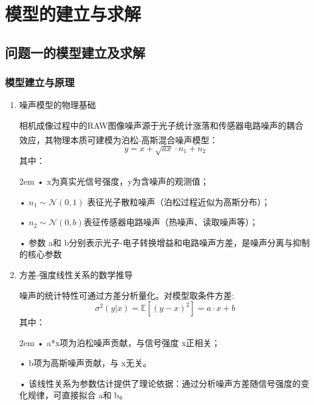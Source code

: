 \documentclass[a4paper]{article}
\newcommand{\supercite}[1]{\textsuperscript{\cite{#1}}}
\begin{document}
	
	
	\section{模型的建立与求解}

	
	\subsection{问题一的模型建立及求解}

	
    \subsubsection{模型建立与原理}
	\begin{enumerate}
		\item 噪声模型的物理基础\par
		相机成像过程中的RAW图像噪声源于光子统计涨落和传感器电路噪声的耦合效应，其物理本质可建模为泊松-高斯混合噪声模型\supercite{ref1}：
		$$
		y = x + \sqrt{a x} \cdot n_1 + n_2
		$$
		其中：\par
		\begin{adjustwidth}{2em}{}
		•	x为真实光信号强度，y为含噪声的观测值；\par
		• $ n_1 \sim \mathcal{N}(0, 1) $ 表征光子散粒噪声（泊松过程近似为高斯分布）；\par
		•	$ n_2 \sim \mathcal{N}(0, b) $表征传感器电路噪声（热噪声、读取噪声等）；\par
		•	参数 a和 b分别表示光子-电子转换增益和电路噪声方差，是噪声分离与抑制的核心参数\par

		\end{adjustwidth}
        \item 方差-强度线性关系的数学推导\par
        噪声的统计特性可通过方差分析量化。对模型取条件方差:
		$$
		\sigma^2(y|x) = \mathbb{E} \left[ (y - x)^2 \right] = a \cdot x + b
		$$
		其中：\par
		\begin{adjustwidth}{2em}{}
			•	a*x项为泊松噪声贡献，与信号强度 x正相关；\par
			•	b项为高斯噪声贡献，与 x无关。\par
			•	该线性关系为参数估计提供了理论依据：通过分析噪声方差随信号强度的变化规律，可直接拟合 a和 b。\par


		\end{adjustwidth}
	\end{enumerate}
\end{document}
